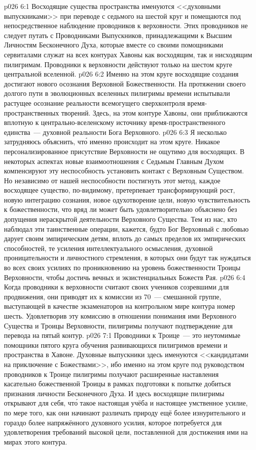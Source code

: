 \vs p026 6:1 Восходящие существа пространства именуются <<духовными выпускниками>> при переводе с седьмого на шестой круг и помещаются под непосредственное наблюдение проводников к верховности. Этих проводников не следует путать с Проводниками Выпускников, принадлежащими к Высшим Личностям Бесконечного Духа, которые вместе со своими помощниками сервиталами служат на всех контурах Хавоны как восходящим, так и нисходящим пилигримам. Проводники к верховности действуют только на шестом круге центральной вселенной.
\vs p026 6:2 Именно на этом круге восходящие создания достигают нового осознания Верховной Божественности. На протяжении своего долгого пути в эволюционных вселенных пилигримы времени испытывали растущее осознание реальности всемогущего сверхконтроля время\hyp{}пространственных творений. Здесь, на этом контуре Хавоны, они приближаются вплотную к центрально\hyp{}вселенскому источнику время\hyp{}пространственного единства~--- духовной реальности Бога Верховного.
\vs p026 6:3 Я несколько затрудняюсь объяснить, чт\'о именно происходит на этом круге. Никакое персонализированное присутствие Верховности не ощутимо для восходящих. В некоторых аспектах новые взаимоотношения с Седьмым Главным Духом компенсируют эту неспособность установить контакт с Верховным Существом. Но независимо от нашей неспособности постигнуть этот метод, каждое восходящее существо, по\hyp{}видимому, претерпевает трансформирующий рост, новую интеграцию сознания, новое одухотворение цели, новую чувствительность к божественности, что вряд ли может быть удовлетворительно объяснено без допущения нераскрытой деятельности Верховного Существа. Тем из нас, кто наблюдал эти таинственные операции, кажется, будто Бог Верховный с любовью дарует своим эмпирическим детям, вплоть до самых пределов их эмпирических способностей, те усиления интеллектуального осмысления, духовной проницательности и личностного стремления, в которых они будут так нуждаться во всех своих усилиях по проникновению на уровень божественности Троицы Верховности, чтобы достичь вечных и экзистенциальных Божеств Рая.
\vs p026 6:4 Когда проводники к верховности считают своих учеников созревшими для продвижения, они приводят их к комиссии из 70~--- смешанной группе, выступающей в качестве экзаменаторов на контрольном мире контура номер шесть. Удовлетворив эту комиссию в отношении понимания ими Верховного Существа и Троицы Верховности, пилигримы получают подтверждение для перевода на пятый контур.
\vs p026 7:1 Проводники к Троице~--- это неутомимые помощники пятого круга обучения развивающихся пилигримов времени и пространства в Хавоне. Духовные выпускники здесь именуются <<кандидатами на приключение с Божествами>>, ибо именно на этом круге под руководством проводников к Троице пилигримы получают расширенные наставления касательно божественной Троицы в рамках подготовки к попытке добиться признания личности Бесконечного Духа. И здесь восходящие пилигримы открывают для себя, чт\'о такое настоящая учёба и настоящее умственное усилие, по мере того, как они начинают различать природу ещё более изнурительного и гораздо более напряжённого духовного усилия, которое потребуется для удовлетворения требований высокой цели, поставленной для достижения ими на мирах этого контура.
